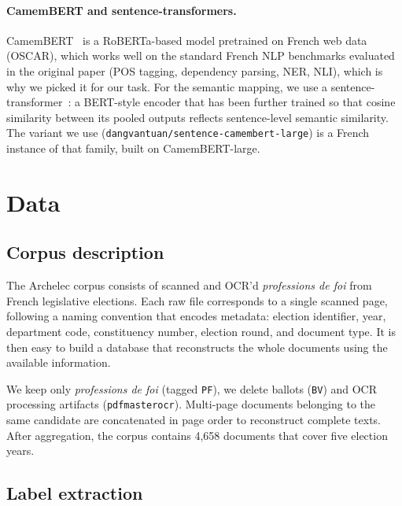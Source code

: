 \documentclass{article}
\begin{document}
\paragraph{CamemBERT and sentence-transformers.}
CamemBERT~\citep{martin2020camembert} is a RoBERTa-based model pretrained on French web data (OSCAR), which works well on the standard French NLP benchmarks evaluated in the original paper (POS tagging, dependency parsing, NER, NLI), which is why we picked it for our task. For the semantic mapping, we use a sentence-transformer~\citep{reimers2019sentence}: a BERT-style encoder that has been further trained so that cosine similarity between its pooled outputs reflects sentence-level semantic similarity. The variant we use (\texttt{dangvantuan/sentence-camembert-large}) is a French instance of that family, built on CamemBERT-large.

\section{Data}
\label{sec:data}

\subsection{Corpus description}

The Archelec corpus consists of scanned and OCR'd \textit{professions de foi} from French legislative elections. Each raw file corresponds to a single scanned page, following a naming convention that encodes metadata: election identifier, year, department code, constituency number, election round, and document type. It is then easy to build a database that reconstructs the whole documents using the available information.

We keep only \textit{professions de foi} (tagged \texttt{PF}), we delete ballots (\texttt{BV}) and OCR processing artifacts (\texttt{pdfmasterocr}). Multi-page documents belonging to the same candidate are concatenated in page order to reconstruct complete texts. After aggregation, the corpus contains 4{,}658 documents that cover five election years.

\subsection{Label extraction}
\label{sec:labels}
\end{document}
